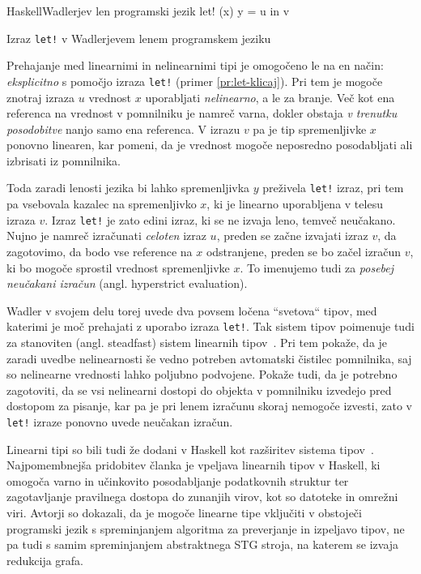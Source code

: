 \begin{primer}[ht]
\centering
\begin{code-box}{Haskell}{Wadlerjev len programski jezik}
let! (x) y = u in v
\end{code-box}
\caption{Izraz \texttt{let!} v Wadlerjevem lenem programskem jeziku}
\label{pr:let-klicaj}
\end{primer}

Prehajanje med linearnimi in nelinearnimi tipi je omogočeno le na en način: \emph{eksplicitno} s pomočjo izraza \texttt{let!} (primer \ref{pr:let-klicaj}). Pri tem je mogoče znotraj izraza $u$ vrednost $x$ uporabljati \emph{nelinearno}, a le za branje. Več kot ena referenca na vrednost v pomnilniku je namreč varna, dokler obstaja \emph{v trenutku posodobitve} nanjo samo ena referenca. V izrazu $v$ pa je tip spremenljivke $x$ ponovno linearen, kar pomeni, da je vrednost mogoče neposredno posodabljati ali izbrisati iz pomnilnika.

Toda zaradi lenosti jezika bi lahko spremenljivka $y$ preživela \texttt{let!} izraz, pri tem pa vsebovala kazalec na spremenljivko $x$, ki je linearno uporabljena v telesu izraza $v$. Izraz \texttt{let!} je zato edini izraz, ki se ne izvaja leno, temveč neučakano. Nujno je namreč izračunati \textit{celoten} izraz $u$, preden se začne izvajati izraz $v$, da zagotovimo, da bodo vse reference na $x$ odstranjene, preden se bo začel izračun $v$, ki bo mogoče sprostil vrednost spremenljivke $x$. To imenujemo tudi za \emph{posebej neučakani izračun} (angl. hyperstrict evaluation).

Wadler v svojem delu torej uvede dva povsem ločena ``svetova`` tipov, med katerimi je moč prehajati z uporabo izraza \texttt{let!}. Tak sistem tipov poimenuje tudi za stanoviten (angl. steadfast) sistem linearnih tipov~\cite{wadler1991there}. Pri tem pokaže, da je zaradi uvedbe nelinearnosti še vedno potreben avtomatski čistilec pomnilnika, saj so nelinearne vrednosti lahko poljubno podvojene. Pokaže tudi, da je potrebno zagotoviti, da se vsi nelinearni dostopi do objekta v pomnilniku izvedejo pred dostopom za pisanje, kar pa je pri lenem izračunu skoraj nemogoče izvesti, zato v \texttt{let!} izraze ponovno uvede neučakan izračun.

Linearni tipi so bili tudi že dodani v Haskell kot razširitev sistema tipov~\cite{bernardy2018linear}. Najpomembnejša pridobitev članka je vpeljava linearnih tipov v Haskell, ki omogoča varno in učinkovito posodabljanje podatkovnih struktur ter zagotavljanje pravilnega dostopa do zunanjih virov, kot so datoteke in omrežni viri. Avtorji so dokazali, da je mogoče linearne tipe vključiti v obstoječi programski jezik s spreminjanjem algoritma za preverjanje in izpeljavo tipov, ne pa tudi s samim spreminjanjem abstraktnega STG stroja, na katerem se izvaja redukcija grafa.

